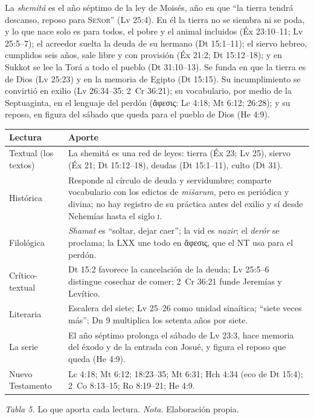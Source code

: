\documentclass[11pt,letterpaper]{article}
\newcommand{\grc}[1]{\foreignlanguage{ancientgreek}{#1}}
\newcommand{\SENOR}{\textsc{Señor}}
\begin{document}
\begin{tcolorbox}[colback=papiro,colframe=tierraroja,boxrule=1pt,arc=3pt,fonttitle=\bfseries,title=Definición]
La \emph{shemitá} es el año séptimo de la ley de Moisés, año en que ``la tierra tendrá descanso, reposo para \SENOR'' (Lv 25:4). En él la tierra no se siembra ni se poda, y lo que nace solo es para todos, el pobre y el animal incluidos (Éx 23:10--11; Lv 25:5--7); el acreedor suelta la deuda de su hermano (Dt 15:1--11); el siervo hebreo, cumplidos seis años, sale libre y con provisión (Éx 21:2; Dt 15:12--18); y en Sukkot se lee la Torá a todo el pueblo (Dt 31:10--13). Se funda en que la tierra es de Dios (Lv 25:23) y en la memoria de Egipto (Dt 15:15). Su incumplimiento se convirtió en exilio (Lv 26:34--35; 2~Cr 36:21); su vocabulario, por medio de la Septuaginta, en el lenguaje del perdón (\grc{ἄφεσις}: Lc 4:18; Mt 6:12; 26:28); y su reposo, en figura del sábado que queda para el pueblo de Dios (He 4:9).
\end{tcolorbox}

\begin{center}\small\renewcommand{\arraystretch}{1.22}
\begin{tabular}{@{}L{3.0cm}L{11.4cm}@{}}
\toprule
\textbf{Lectura} & \textbf{Aporte} \\ \midrule
Textual (los textos) & La shemitá es una red de leyes: tierra (Éx 23; Lv 25), siervo (Éx 21; Dt 15:12--18), deudas (Dt 15:1--11), culto (Dt 31). \\
Histórica & Responde al círculo de deuda y servidumbre; comparte vocabulario con los edictos de \emph{mīšarum}, pero es periódica y divina; no hay registro de su práctica antes del exilio y sí desde Nehemías hasta el siglo \textsc{i}. \\
Filológica & \emph{Shamat} es ``soltar, dejar caer''; la vid es \emph{nazir}; el \emph{derór} se proclama; la LXX une todo en \grc{ἄφεσις}, que el NT usa para el perdón. \\
Crítico-textual & Dt 15:2 favorece la cancelación de la deuda; Lv 25:5--6 distingue cosechar de comer; 2~Cr 36:21 funde Jeremías y Levítico. \\
Literaria & Escalera del siete; Lv 25--26 como unidad sinaítica; ``siete veces más''; Dn 9 multiplica los setenta años por siete. \\
La serie & El año séptimo prolonga el sábado de Lv 23:3, hace memoria del éxodo y de la entrada con Josué, y figura el reposo que queda (He 4:9). \\
Nuevo Testamento & Lc 4:18; Mt 6:12; 18:23--35; Mt 6:31; Hch 4:34 (eco de Dt 15:4); 2~Co 8:13--15; Ro 8:19--21; He 4:9. \\
\bottomrule
\end{tabular}\par
{\footnotesize\color{sepia}\textit{Tabla 5.} Lo que aporta cada lectura. \textit{Nota.} Elaboración propia.}
\end{center}
\end{document}
